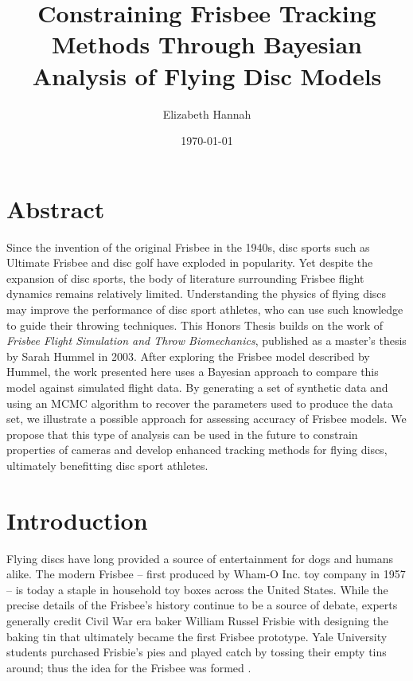 \documentclass[a4paper,12pt, oneside]{article}
\title{Constraining Frisbee Tracking Methods Through Bayesian Analysis of Flying Disc Models}
\author{Elizabeth Hannah}
\date{\today}
\begin{document}
\maketitle

\section*{Abstract}
Since the invention of the original Frisbee in the 1940s, disc sports such as Ultimate Frisbee and disc golf have exploded in popularity. Yet despite the expansion of disc sports, the body of literature surrounding Frisbee flight dynamics remains relatively limited. Understanding the physics of flying discs may improve the performance of disc sport athletes, who can use such knowledge to guide their throwing techniques. This Honors Thesis builds on the work of \textit{Frisbee Flight Simulation and Throw Biomechanics}, published as a master's thesis by Sarah Hummel in 2003. After exploring the Frisbee model described by Hummel, the work presented here uses a Bayesian approach to compare this model against simulated flight data. By generating a set of synthetic data and using an MCMC algorithm to recover the parameters used to produce the data set, we illustrate a possible approach for assessing accuracy of Frisbee models. We propose that this type of analysis can be used in the future to constrain properties of cameras and develop enhanced tracking methods for flying discs, ultimately benefitting disc sport athletes.
\section{Introduction}

Flying discs have long provided a source of entertainment for dogs and humans alike.  The modern Frisbee -- first produced by Wham-O Inc. toy company in 1957 -- is today a staple in household toy boxes across the United States.  While the precise details of the Frisbee's history continue to be a source of debate, experts generally credit Civil War era baker William Russel Frisbie with designing the baking tin that ultimately became the first Frisbee prototype.  Yale University students purchased Frisbie's pies and played catch by tossing their empty tins around; thus the idea for the Frisbee was formed \cite{frisorigins}.  
\end{document}
